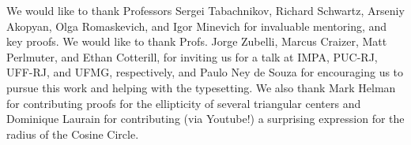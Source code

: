 \begin{acknowledgements}
We would like to thank Professors Sergei Tabachnikov, Richard Schwartz, Arseniy Akopyan, Olga Romaskevich, and Igor Minevich for invaluable mentoring, and key proofs. We would like to thank Profs. Jorge Zubelli, Marcus Craizer, Matt Perlmuter, and Ethan Cotterill, for inviting us for a talk at IMPA, PUC-RJ, UFF-RJ, and UFMG, respectively, and Paulo Ney de Souza for encouraging us to pursue this work and helping with the typesetting. We also thank Mark Helman for contributing proofs for the ellipticity of several triangular centers and Dominique Laurain for contributing (via Youtube!) a surprising expression for the radius of the Cosine Circle.
\end{acknowledgements}